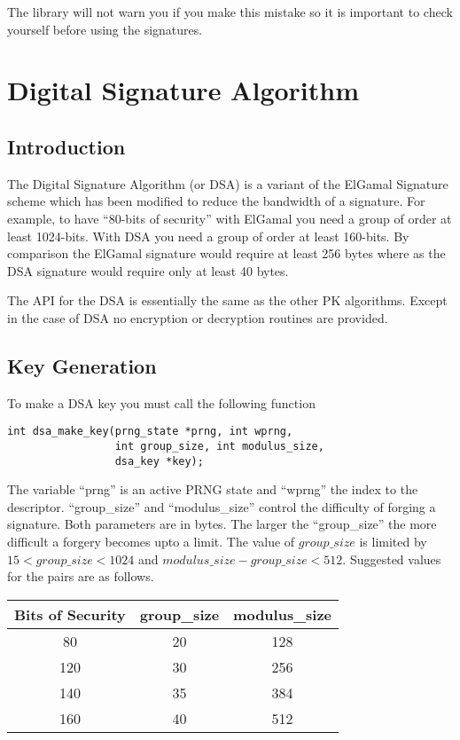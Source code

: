 \documentclass[a4paper]{book}
\begin{document}
The library will not warn you if you make this mistake so it is important to check yourself before using the 
signatures.

\chapter{Digital Signature Algorithm}
\section{Introduction}
The Digital Signature Algorithm (or DSA) is a variant of the ElGamal Signature scheme which has been modified to 
reduce the bandwidth of a signature.  For example, to have ``80-bits of security'' with ElGamal you need a group of 
order at least 1024-bits.  With DSA you need a group of order at least 160-bits.  By comparison the ElGamal signature
would require at least 256 bytes where as the DSA signature would require only at least 40 bytes.  

The API for the DSA is essentially the same as the other PK algorithms.  Except in the case of DSA no encryption or
decryption routines are provided.  

\section{Key Generation}
To make a DSA key you must call the following function
\begin{verbatim}
int dsa_make_key(prng_state *prng, int wprng, 
                 int group_size, int modulus_size, 
                 dsa_key *key);
\end{verbatim}
The variable ``prng'' is an active PRNG state and ``wprng'' the index to the descriptor.  ``group\_size'' and 
``modulus\_size'' control the difficulty of forging a signature.  Both parameters are in bytes.  The larger the
``group\_size'' the more difficult a forgery becomes upto a limit.  The value of $group\_size$ is limited by 
$15 < group\_size < 1024$ and $modulus\_size - group\_size < 512$.  Suggested values for the pairs are as follows.

\begin{center}
\begin{tabular}{|c|c|c|}
\hline \textbf{Bits of Security} & \textbf{group\_size} & \textbf{modulus\_size} \\
\hline 80  & 20 & 128 \\
\hline 120 & 30 & 256 \\
\hline 140 & 35 & 384 \\
\hline 160 & 40 & 512 \\
\hline
\end{tabular}
\end{center}
\end{document}
